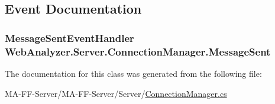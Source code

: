 \subsection{Event Documentation}
\hypertarget{class_web_analyzer_1_1_server_1_1_connection_manager_a2eb5de18882e69a65b4b7ce3ee458af1}{}
\subsubsection[{Message\+Sent}]{\setlength{\rightskip}{0pt plus 5cm}Message\+Sent\+Event\+Handler Web\+Analyzer.\+Server.\+Connection\+Manager.\+Message\+Sent}\label{class_web_analyzer_1_1_server_1_1_connection_manager_a2eb5de18882e69a65b4b7ce3ee458af1}


The documentation for this class was generated from the following file\+:\begin{DoxyCompactItemize}
\item 
M\+A-\/\+F\+F-\/\+Server/\+M\+A-\/\+F\+F-\/\+Server/\+Server/\hyperlink{_connection_manager_8cs}{Connection\+Manager.\+cs}\end{DoxyCompactItemize}
